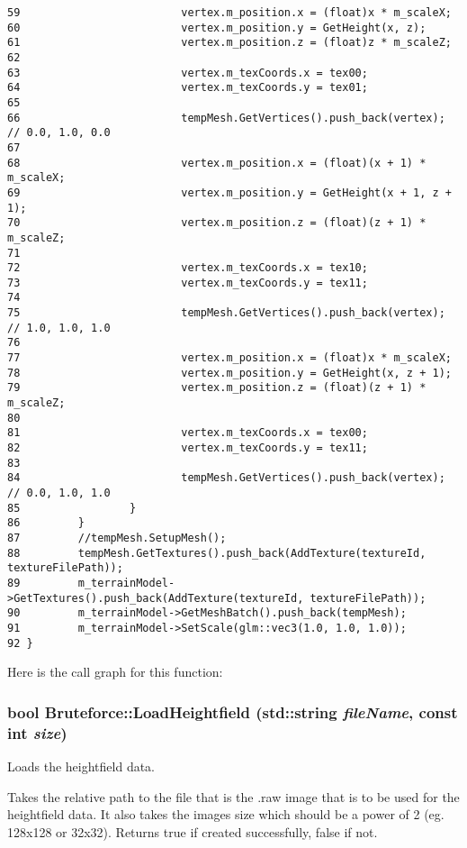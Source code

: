 \begin{Code}
\begin{verbatim}
59                         vertex.m_position.x = (float)x * m_scaleX;
60                         vertex.m_position.y = GetHeight(x, z);
61                         vertex.m_position.z = (float)z * m_scaleZ;
62 
63                         vertex.m_texCoords.x = tex00;
64                         vertex.m_texCoords.y = tex01;
65 
66                         tempMesh.GetVertices().push_back(vertex); // 0.0, 1.0, 0.0
67 
68                         vertex.m_position.x = (float)(x + 1) * m_scaleX;
69                         vertex.m_position.y = GetHeight(x + 1, z + 1);
70                         vertex.m_position.z = (float)(z + 1) * m_scaleZ;
71 
72                         vertex.m_texCoords.x = tex10;
73                         vertex.m_texCoords.y = tex11;
74 
75                         tempMesh.GetVertices().push_back(vertex); // 1.0, 1.0, 1.0
76 
77                         vertex.m_position.x = (float)x * m_scaleX;
78                         vertex.m_position.y = GetHeight(x, z + 1);
79                         vertex.m_position.z = (float)(z + 1) * m_scaleZ;
80 
81                         vertex.m_texCoords.x = tex00;
82                         vertex.m_texCoords.y = tex11;
83                         
84                         tempMesh.GetVertices().push_back(vertex); // 0.0, 1.0, 1.0
85                 }
86         }
87         //tempMesh.SetupMesh();
88         tempMesh.GetTextures().push_back(AddTexture(textureId, textureFilePath));
89         m_terrainModel->GetTextures().push_back(AddTexture(textureId, textureFilePath));
90         m_terrainModel->GetMeshBatch().push_back(tempMesh);
91         m_terrainModel->SetScale(glm::vec3(1.0, 1.0, 1.0));
92 }
\end{verbatim}
\end{Code}




Here is the call graph for this function:\hypertarget{class_bruteforce_adf9803b858d6d43bc887d7a3506fb2a}{
\subsubsection[LoadHeightfield]{\setlength{\rightskip}{0pt plus 5cm}bool Bruteforce::LoadHeightfield (std::string {\em fileName}, \/  const int {\em size})}}
\label{class_bruteforce_adf9803b858d6d43bc887d7a3506fb2a}


Loads the heightfield data. 

Takes the relative path to the file that is the .raw image that is to be used for the heightfield data. It also takes the images size which should be a power of 2 (eg. 128x128 or 32x32). Returns true if created successfully, false if not.

